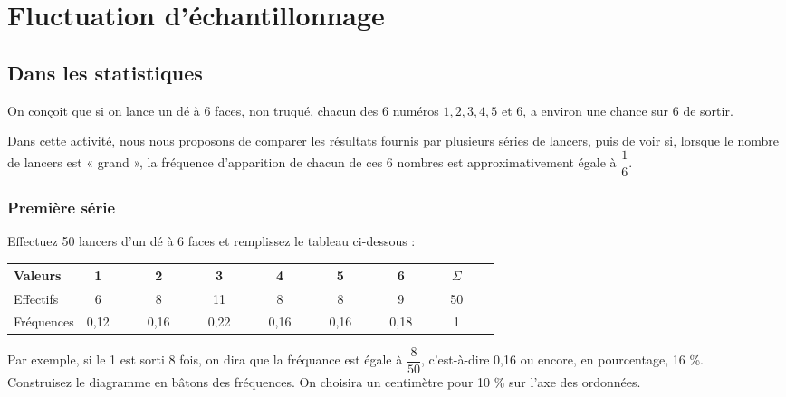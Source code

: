 \section{Fluctuation d'échantillonnage}

\subsection{Dans les statistiques}

On conçoit que si on lance un dé à 6 faces, non truqué, chacun des 6 numéros $1, 2, 3, 4, 5$  et $ 6$,  a environ une chance sur 6 de sortir.

Dans cette activité, nous nous proposons de comparer les résultats fournis par plusieurs séries de lancers, puis de voir si, lorsque le nombre de lancers est « grand », la fréquence d'apparition de chacun de ces 6 nombres est approximativement égale à $\dfrac{1}{6}$. 

\subsubsection*{Première série}

Effectuez 50 lancers d'un dé à 6 faces et remplissez le tableau ci-dessous : \\

\begin{tabular}{|l|ccc|ccc|ccc|ccc|ccc|ccc|ccc|}
\hline
Valeurs & 1 & & & 2 & & & 3 & & & 4 & & & 5 & & & 6 & & & $\Sigma$ & &  \\
\hline
Effectifs & 6 & & & 8 & & & 11 & & & 8 & & & 8 & & & 9 & & & 50 & & \\
\hline
Fréquences & 0,12 & & & 0,16 & & & 0,22 & & & 0,16 & & & 0,16 & & & 0,18 & & & 1 & & \\
\hline
\end{tabular}

\vspace*{.3cm}

Par exemple, si le 1 est sorti 8 fois, on dira que la fréquance est égale à $\dfrac{8}{50}$, c'est-à-dire 0,16 ou encore, en pourcentage, 16 \%. \\

Construisez le diagramme en bâtons des fréquences. On choisira un centimètre pour 10 \% sur l'axe des ordonnées.


\begin{center}


\end{center}

